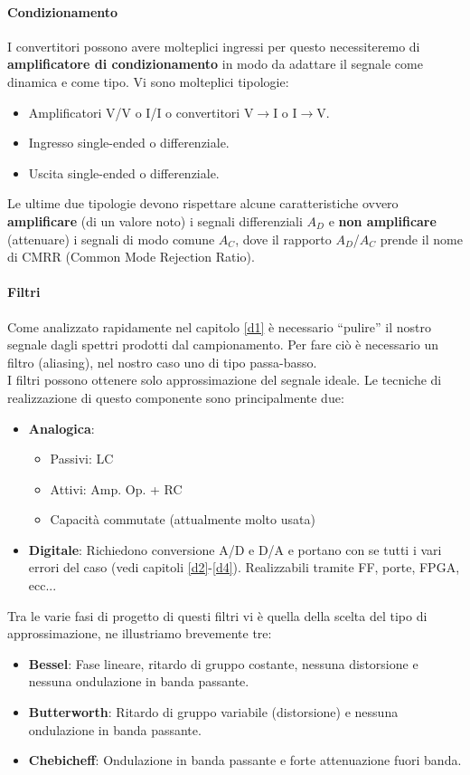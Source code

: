 \documentclass[12pt]{article}
\begin{document}
\paragraph{Condizionamento} I convertitori possono avere molteplici ingressi per questo necessiteremo di \textbf{amplificatore di condizionamento} in modo da adattare il segnale come dinamica e come tipo. Vi sono molteplici tipologie:
\begin{itemize}
  \item Amplificatori V/V o I/I o convertitori V$\rightarrow$I o I$\rightarrow$V.
  \item Ingresso single-ended o differenziale.
  \item Uscita single-ended o differenziale.
\end{itemize}

Le ultime due tipologie devono rispettare alcune caratteristiche ovvero \textbf{amplificare} (di un valore noto) i segnali differenziali $A_{D}$ e \textbf{non amplificare} (attenuare) i segnali di modo comune $A_{C}$, dove il rapporto $A_{D}$/$A_{C}$ prende il nome di CMRR (Common Mode Rejection Ratio).

\paragraph{Filtri} Come analizzato rapidamente nel capitolo \ref{d1} è necessario ``pulire'' il nostro segnale dagli spettri prodotti dal campionamento. Per fare ciò è necessario un filtro (aliasing), nel nostro caso uno di tipo passa-basso.\\
I filtri possono ottenere solo approssimazione del segnale ideale. Le tecniche di realizzazione di questo componente sono principalmente due:
\begin{itemize}
  \item \textbf{Analogica}:
  \begin{itemize}
    \item Passivi: LC
    \item Attivi: Amp. Op. + RC
    \item Capacità commutate (attualmente molto usata)
  \end{itemize}
  \item \textbf{Digitale}: Richiedono conversione A/D e D/A e portano con se tutti i vari errori del caso (vedi capitoli \ref{d2}-\ref{d4}). Realizzabili tramite FF, porte, FPGA, ecc...
\end{itemize}

Tra le varie fasi di progetto di questi filtri vi è quella della scelta del tipo di approssimazione, ne illustriamo brevemente tre:
\begin{itemize}
  \item \textbf{Bessel}: Fase lineare, ritardo di gruppo costante, nessuna distorsione e nessuna ondulazione in banda passante.
  \item \textbf{Butterworth}: Ritardo di gruppo variabile (distorsione) e nessuna ondulazione in banda passante.
  \item \textbf{Chebicheff}: Ondulazione in banda passante e forte attenuazione fuori banda.
\end{itemize}
\end{document}
